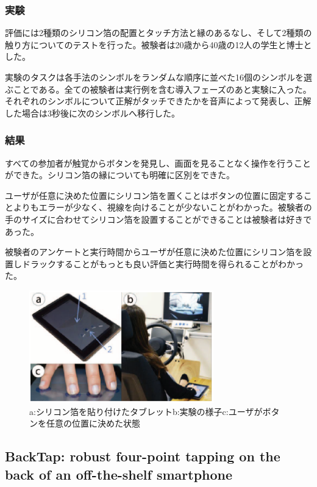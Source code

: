 \documentclass[11pt,a4paper]{jarticle}
\begin{document}
\subsubsection{実験}
評価には2種類のシリコン箔の配置とタッチ方法と縁のあるなし、そして2種類の触り方についてのテストを行った。被験者は20歳から40歳の12人の学生と博士とした。

実験のタスクは各手法のシンボルをランダムな順序に並べた16個のシンボルを選ぶことである。全ての被験者は実行例を含む導入フェーズのあと実験に入った。それぞれのシンボルについて正解がタッチできたかを音声によって発表し、正解した場合は3秒後に次のシンボルへ移行した。

\subsubsection{結果}
すべての参加者が触覚からボタンを発見し、画面を見ることなく操作を行うことができた。シリコン箔の縁についても明確に区別をできた。

ユーザが任意に決めた位置にシリコン箔を置くことはボタンの位置に固定することよりもエラーが少なく、視線を向けることが少ないことがわかった。被験者の手のサイズに合わせてシリコン箔を設置することができることは被験者は好きであった。

被験者のアンケートと実行時間からユーザが任意に決めた位置にシリコン箔を設置しドラックすることがもっとも良い評価と実行時間を得られることがわかった。

\begin{figure}[H]
  \begin{center}
  \includegraphics[width=8cm]{figure1.eps}
  \caption{a:シリコン箔を貼り付けたタブレットb:実験の様子c:ユーザがボタンを任意の位置に決めた状態}
  \label{fig:1_test}
  \end{center}
\end{figure}


\subsection{BackTap: robust four-point tapping on the back of an off-the-shelf smartphone\cite{Zhang:2013}}
\end{document}
